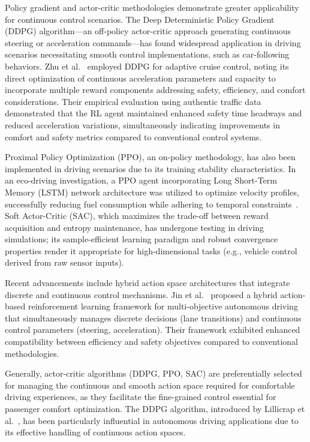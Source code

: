\documentclass[12pt,a4paper]{article}
\begin{document}
Policy gradient and actor-critic methodologies demonstrate greater applicability for continuous control scenarios. The Deep Deterministic Policy Gradient (DDPG) algorithm—an off-policy actor-critic approach generating continuous steering or acceleration commands—has found widespread application in driving scenarios necessitating smooth control implementations, such as car-following behaviors. Zhu et al.~\cite{zhu2020} employed DDPG for adaptive cruise control, noting its direct optimization of continuous acceleration parameters and capacity to incorporate multiple reward components addressing safety, efficiency, and comfort considerations. Their empirical evaluation using authentic traffic data demonstrated that the RL agent maintained enhanced safety time headways and reduced acceleration variations, simultaneously indicating improvements in comfort and safety metrics compared to conventional control systems.

Proximal Policy Optimization (PPO), an on-policy methodology, has also been implemented in driving scenarios due to its training stability characteristics. In an eco-driving investigation, a PPO agent incorporating Long Short-Term Memory (LSTM) network architecture was utilized to optimize velocity profiles, successfully reducing fuel consumption while adhering to temporal constraints~\cite{zhu2021}. Soft Actor-Critic (SAC), which maximizes the trade-off between reward acquisition and entropy maintenance, has undergone testing in driving simulations; its sample-efficient learning paradigm and robust convergence properties render it appropriate for high-dimensional tasks (e.g., vehicle control derived from raw sensor inputs).

Recent advancements include hybrid action space architectures that integrate discrete and continuous control mechanisms. Jin et al.~\cite{jin2025} proposed a hybrid action-based reinforcement learning framework for multi-objective autonomous driving that simultaneously manages discrete decisions (lane transitions) and continuous control parameters (steering, acceleration). Their framework exhibited enhanced compatibility between efficiency and safety objectives compared to conventional methodologies.

Generally, actor-critic algorithms (DDPG, PPO, SAC) are preferentially selected for managing the continuous and smooth action space required for comfortable driving experiences, as they facilitate the fine-grained control essential for passenger comfort optimization. The DDPG algorithm, introduced by Lillicrap et al.~\cite{lillicrap2016}, has been particularly influential in autonomous driving applications due to its effective handling of continuous action spaces.
\end{document}
